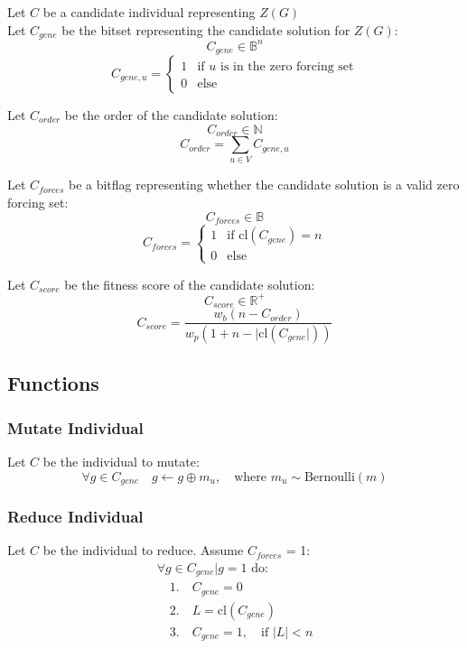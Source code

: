 \documentclass[11pt]{article}
\begin{document}
Let $C$ be a candidate individual representing $Z(G)$ \\

Let $C_{gene}$ be the bitset representing the candidate solution for $Z(G)$:
$$C_{gene} \in \mathbb{B}^n$$
$$C_{gene, u} = \begin{cases}
\text{1} & \text{if } u \text{ is in the zero forcing set} \\
\text{0} & \text{else}
\end{cases}$$

Let $C_{order}$ be the order of the candidate solution:
$$C_{order} \in \mathbb{N}$$
$$C_{order} = \sum_{u \in V}{C_{gene, u}}$$

Let $C_{forces}$ be a bitflag representing whether the candidate solution is a valid zero forcing set:
$$C_{forces} \in \mathbb{B}$$
$$C_{forces} = \begin{cases}
\text{1} & \text{if } \text{cl}(C_{gene}) = n \\
\text{0} & \text{else}
\end{cases}$$

Let $C_{score}$ be the fitness score of the candidate solution:
$$C_{score} \in \mathbb{R}^+$$
$$C_{score} = \frac{w_b(n - C_{order})}{w_p(1 + n - |\text{cl}(C_{gene}|))}$$

\subsection{Functions}

\subsubsection{Mutate Individual}

Let $C$ be the individual to mutate:
$$\forall g \in C_{gene} \quad g \leftarrow g \oplus m_u, \quad \text{where } m_u \sim \text{Bernoulli}(m)$$

\subsubsection{Reduce Individual}

Let $C$ be the individual to reduce. Assume $C_{forces}$ = 1:
$$\begin{array}{ll}
\forall g \in C_{gene} | g=1 \text{ do:} \\
\quad 1. \quad C_{gene} = 0 \\
\quad 2. \quad L = \text{cl}(C_{gene}) \\
\quad 3. \quad C_{gene} = 1, \quad\text{if } |L| < n
\end{array}$$
\end{document}
